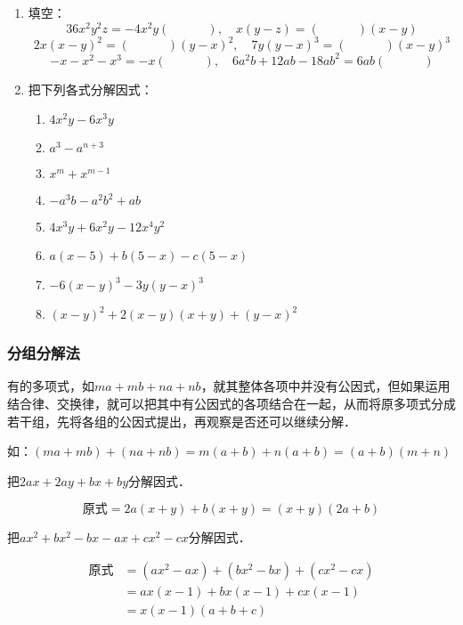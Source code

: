 \begin{ex}
\begin{enumerate}
    \item 填空：
\[36x^2y^2z=-4x^2y(\qquad\quad),\quad x(y-z)=(\qquad\quad)(x-y)  \]
\[2x(x-y)^2=(\qquad\quad)(y-x)^2,\quad 7y(y-x)^3=(\qquad\quad)(x-y)^3\]
\[-x-x^2-x^3=-x(\quad\qquad),\quad 6a^2b+12ab-18ab^2=6ab(\quad\qquad)\]

\item 把下列各式分解因式：
\begin{enumerate}
    \item $4x^2y-6x^3y$
    \item $a^3-a^{n+3}$
    \item $x^m+x^{m-1}$
    \item $-a^3b-a^2b^2+ab$
    \item $4x^3y+6x^2y-12x^4y^2$
    \item $a(x-5)+b(5-x)-c(5-x)$
    \item $-6(x-y)^3-3y(y-x)^3$
    \item $(x-y)^2+2(x-y)(x+y)+(y-x)^2$
\end{enumerate}
\end{enumerate}
\end{ex}

\subsubsection{分组分解法}
有的多项式，如$ma+mb+na+nb$，就其整体各项中并没有公因式，但如果运用结合律、交换律，就可以把其中有公因式的各项结合在一起，从而将原多项式分成若干组，先将各组的公因式提出，再观察是否还可以继续分解．

如：$(ma+mb)+(na+nb)=m(a+b)+n(a+b)=(a+b)(m+n)$

\begin{example}
    把$2ax+2ay+bx+by$分解因式．
\end{example}

\begin{solution}
    \[\text{原式}=2a(x+y)+b(x+y)
    = (x+y) (2a+b)\]
\end{solution}

\begin{example}
    把$ax^2+bx^2-bx-ax+cx^2-cx$分解因式．
\end{example}

\begin{solution}
\[\begin{split}
    \text{原式}&=(ax^2-ax)+(bx^2-bx)+(cx^2-cx)\\
&=ax (x-1) +bx (x-1) +cx (x-1)\\
&=x (x-1) (a+b+c)
\end{split}\]    
\end{solution}

